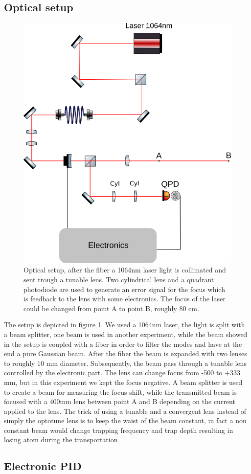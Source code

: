 \documentclass[a4paper,10pt]{article}
\begin{document}
\subsection{Optical setup}
\begin{figure}
\centering
\includegraphics[width = .5\textwidth]{opticsetup}
\caption{Optical setup, after the fiber a 1064nm laser light is collimated and sent trough a tunable lens. Two cylindrical lens and a quadrant photodiode are used to generate an error signal for the focus which is feedback to the lens with some electronics. The focus of the laser could be changed from point A to point B, roughly 80 cm.} \label{img:opticsetup}
\end{figure}
The setup is depicted in figure \ref{img:opticsetup}. We used a 1064nm laser, the light is split with a beam splitter, one beam is used in another experiment, while the beam showed in the setup is coupled with a fiber in order to filter the modes and have at the end a pure Gaussian beam. After the fiber the beam is expanded with two lenses to roughly 10 mm diameter. Subsequently, the beam pass through a tunable lens controlled by the electronic part. The lens can change focus from  -500 to +333 mm, but in this experiment we kept the focus negative. A beam splitter is used to create a beam for measuring the focus shift, while the transmitted beam is focused with a 400mm lens between point A and B depending on the current applied to the lens. The trick of using a tunable and a convergent lens instead of simply the optotune lens is to keep the waist of the beam constant, in fact a non constant beam would change trapping frequency and trap depth resulting in losing atom during the transportation \cite{opticaltransportation}


\subsection{Electronic PID}
\end{document}
